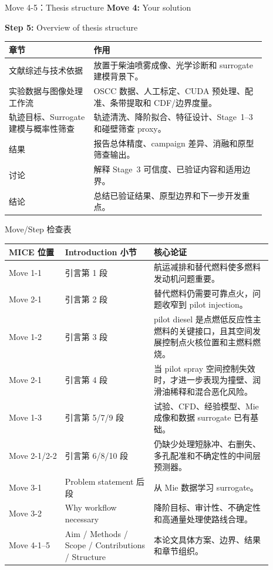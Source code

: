 \documentclass[aspectratio=169,11pt]{beamer}
\newcommand{\movetag}[2]{\textbf{Move #1:} #2}
\newcommand{\steptag}[2]{\textbf{Step #1:} #2}
\begin{document}
\begin{frame}{Move 4-5：Thesis structure}
\scriptsize
\movetag{4}{Your solution}

\vspace{0.5em}
\steptag{5}{Overview of thesis structure}

\vspace{0.6em}
\begin{tabular}{L{0.29\linewidth}L{0.58\linewidth}}
\toprule
章节 & 作用 \\
\midrule
文献综述与技术依据 & 放置于柴油喷雾成像、光学诊断和 surrogate 建模背景下。 \\
实验数据与图像处理工作流 & OSCC 数据、人工标定、CUDA 预处理、配准、条带提取和 CDF/边界度量。 \\
轨迹目标、Surrogate 建模与概率性筛查 & 轨迹清洗、降阶拟合、特征设计、Stage~1--3 和碰壁筛查 proxy。 \\
结果 & 报告总体精度、campaign 差异、消融和原型筛查输出。 \\
讨论 & 解释 Stage~3 可信度、已验证内容和适用边界。 \\
结论 & 总结已验证结果、原型边界和下一步开发重点。 \\
\bottomrule
\end{tabular}
\end{frame}

\begin{frame}{Move/Step 检查表}
\scriptsize
\begin{tabular}{L{0.19\linewidth}L{0.30\linewidth}L{0.40\linewidth}}
\toprule
MICE 位置 & Introduction 小节 & 核心论证 \\
\midrule
Move 1-1 & 引言第 1 段 & 航运减排和替代燃料使多燃料发动机问题重要。 \\
Move 2-1 & 引言第 2 段 & 替代燃料仍需要可靠点火，问题收窄到 pilot injection。 \\
Move 1-2 & 引言第 3 段 & pilot diesel 是点燃低反应性主燃料的关键接口，且其空间发展控制点火核位置和主燃料燃烧。 \\
Move 2-1 & 引言第 4 段 & 当 pilot spray 空间控制失效时，才进一步表现为撞壁、润滑油稀释和混合恶化风险。 \\
Move 1-3 & 引言第 5/7/9 段 & 试验、CFD、经验模型、Mie 成像和数据 surrogate 已有基础。 \\
Move 2-1/2-2 & 引言第 6/8/10 段 & 仍缺少处理短脉冲、右删失、多孔配准和不确定性的中间层预测器。 \\
Move 3-1 & Problem statement 后段 & 从 Mie 数据学习 surrogate。 \\
Move 3-2 & Why workflow necessary & 降阶目标、审计性、不确定性和高通量处理使路线合理。 \\
Move 4-1--5 & Aim / Methods / Scope / Contributions / Structure & 本论文具体方案、边界、结果和章节组织。 \\
\bottomrule
\end{tabular}
\end{frame}
\end{document}
